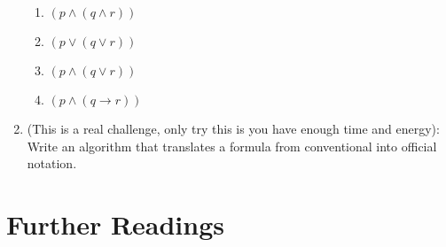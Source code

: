 \begin{enumerate}[\thesection.1]
\begin{enumerate}
			\item $(p\land (q\land r))$
			
			\item $(p\lor (q\lor r))$
			
			\item $(p\land (q\lor r))$
			
			\item $(p\land (q\to r))$
				
		\end{enumerate}
		
		\item (This is a real challenge, only try this is you have enough time and energy): Write an algorithm that translates a formula from conventional into official notation. 

	\end{enumerate}

\section{Further Readings}

